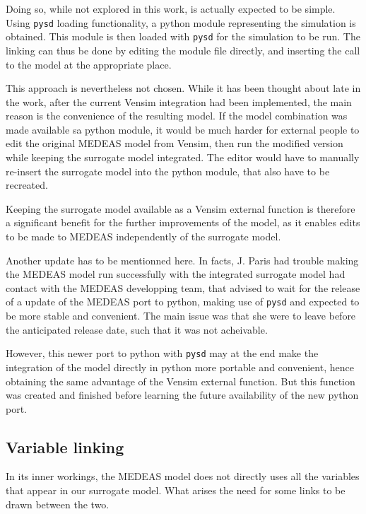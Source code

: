 Doing so, while not explored in this work, is actually expected to be simple. Using \texttt{pysd} loading functionality, a python module representing the simulation is obtained. This module is then loaded with \texttt{pysd} for the simulation to be run. The linking can thus be done by editing the module file directly, and inserting the call to the model at the appropriate place. 

This approach is nevertheless not chosen. While it has been thought about late in the work, after the current Vensim integration had been implemented, the main reason is the convenience of the resulting model. If the model combination was made available sa python module, it would be much harder for external people to edit the original MEDEAS model from Vensim, then run the modified version while keeping the surrogate model integrated. The editor would have to manually re-insert the surrogate model into the python module, that also have to be recreated.

Keeping the surrogate model available as a Vensim external function is therefore a significant benefit for the further improvements of the model, as it enables edits to be made to MEDEAS independently of the surrogate model.

Another update has to be mentionned here. In facts, J. Paris had trouble making the MEDEAS model run successfully with the integrated surrogate model had contact with the MEDEAS developping team, that advised to wait for the release of a update of the MEDEAS port to python, making use of \texttt{pysd} and expected to be more stable and convenient. The main issue was that she were to leave before the anticipated release date, such that it was not acheivable.

However, this newer port to python with \texttt{pysd} may at the end make the integration of the model directly in python more portable and convenient, hence obtaining the same advantage of the Vensim external function. But this function was created and finished before learning the future availability of the new python port.


\subsection{Variable linking}

In its inner workings, the MEDEAS model does not directly uses all the variables that appear in our surrogate model. What arises the need for some links to be drawn between the two.

